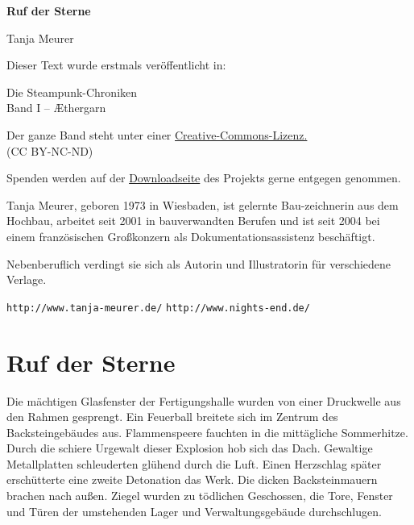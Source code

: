 \usepackage[ngerman]{babel}
\usepackage[T1]{fontenc}
\usepackage{textcomp}



\renewcommand*{\tb}{\begin{center}* \quad * \quad *\end{center}}

\newcommand\bigpar\medskip


\raggedbottom
\begin{center}
\textbf{\huge\textsf{Ruf der Sterne}}

\bigskip
Tanja Meurer
\end{center}

\bigskip

\begin{flushleft}
Dieser Text wurde erstmals veröffentlicht in:
\begin{center}
Die Steampunk-Chroniken\\
Band I -- Æthergarn
\end{center}

\bigskip

Der ganze Band steht unter einer
\href{http://creativecommons.org/licenses/by-nc-nd/2.0/de/}{Creative-Commons-Lizenz.} \\
(CC BY-NC-ND)

\bigskip

Spenden werden auf der
\href{http://steampunk-chroniken.de/download}{Downloadseite}
des Projekts gerne entgegen genommen.

\vfill

Tanja Meurer, geboren 1973 in Wiesbaden, ist gelernte
Bau-zeichnerin aus dem Hochbau, arbeitet seit 2001 in bauverwandten
Berufen und ist seit 2004 bei einem französischen Großkonzern als
Dokumentationsassistenz beschäftigt.

Nebenberuflich verdingt sie sich als Autorin und Illustratorin für
verschiedene Verlage.

\texttt{http://www.tanja-meurer.de/}
\texttt{http://www.nights-end.de/}

\end{flushleft}


\section{Ruf der Sterne}

Die mächtigen Glasfenster der Fertigungshalle wurden von einer
Druckwelle aus den Rahmen gesprengt. Ein Feuerball breitete sich im
Zentrum des Backsteingebäudes aus. Flammenspeere fauchten in die
mittägliche Sommerhitze. Durch die schiere Urgewalt dieser
Explosion hob sich das Dach. Gewaltige Metallplatten schleuderten
glühend durch die Luft. Einen Herzschlag später erschütterte eine
zweite Detonation das Werk. Die dicken Backsteinmauern brachen nach
außen. Ziegel wurden zu tödlichen Geschossen, die Tore, Fenster und
Türen der umstehenden Lager und Verwaltungsgebäude durchschlugen.

